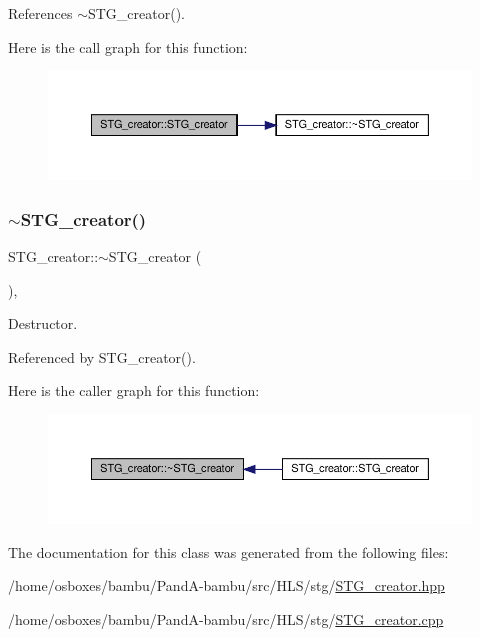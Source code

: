 References $\sim$\+S\+T\+G\+\_\+creator().

Here is the call graph for this function\+:
\nopagebreak
\begin{figure}[H]
\begin{center}
\leavevmode
\includegraphics[width=350pt]{d7/dda/classSTG__creator_a7d9a3b78fc88a228a77b70a7bc5a576d_cgraph}
\end{center}
\end{figure}
\mbox{\label{classSTG__creator_aefc59a7d50edb1dd2990e8589fae52ba}} 
\subsubsection{\texorpdfstring{$\sim$\+S\+T\+G\+\_\+creator()}{~STG\_creator()}}
{\footnotesize\ttfamily S\+T\+G\+\_\+creator\+::$\sim$\+S\+T\+G\+\_\+creator (\begin{DoxyParamCaption}{ }\end{DoxyParamCaption})\hspace{0.3cm}{\ttfamily [override]}, {\ttfamily [default]}}



Destructor. 



Referenced by S\+T\+G\+\_\+creator().

Here is the caller graph for this function\+:
\nopagebreak
\begin{figure}[H]
\begin{center}
\leavevmode
\includegraphics[width=350pt]{d7/dda/classSTG__creator_aefc59a7d50edb1dd2990e8589fae52ba_icgraph}
\end{center}
\end{figure}


The documentation for this class was generated from the following files\+:\begin{DoxyCompactItemize}
\item 
/home/osboxes/bambu/\+Pand\+A-\/bambu/src/\+H\+L\+S/stg/\hyperlink{STG__creator_8hpp}{S\+T\+G\+\_\+creator.\+hpp}\item 
/home/osboxes/bambu/\+Pand\+A-\/bambu/src/\+H\+L\+S/stg/\hyperlink{STG__creator_8cpp}{S\+T\+G\+\_\+creator.\+cpp}\end{DoxyCompactItemize}

